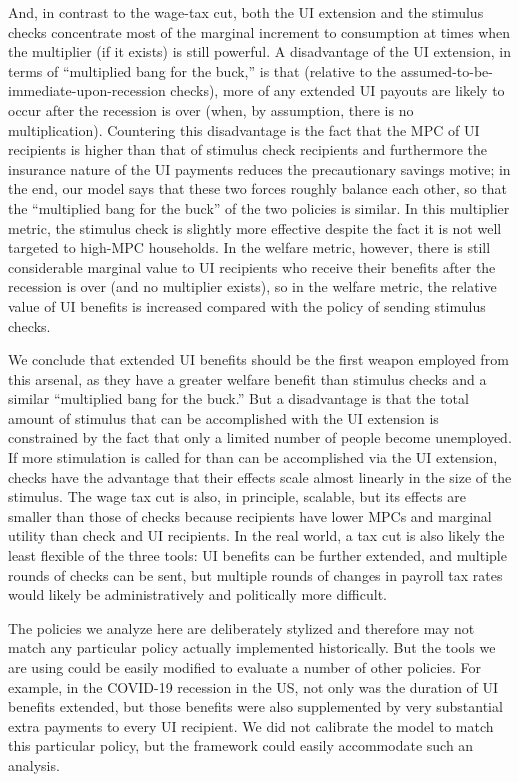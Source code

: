 \documentclass[\econtexRoot/HAFiscal]{subfiles}
\begin{document}
And, in contrast to the wage-tax cut, both the UI extension and the stimulus checks concentrate most of the marginal increment to consumption at times when the multiplier (if it exists) is still powerful.  A disadvantage of the UI extension, in terms of ``multiplied bang for the buck,'' is that (relative to the assumed-to-be-immediate-upon-recession checks), more of any extended UI payouts are likely to occur after the recession is over (when, by assumption, there is no multiplication).  Countering this disadvantage is the fact that the MPC of UI recipients is higher than that of stimulus check recipients and furthermore the insurance nature of the UI payments reduces the precautionary savings motive; in the end, our model says that these two forces roughly balance each other, so that the ``multiplied bang for the buck'' of the two policies is similar.  In this multiplier metric, the stimulus check is slightly more effective despite the fact it is not well targeted to high-MPC households.  In the welfare metric, however, there is still considerable marginal value to UI recipients who receive their benefits after the recession is over (and no multiplier exists), so in the welfare metric, the relative value of UI benefits is increased compared with the policy of sending stimulus checks.

We conclude that extended UI benefits should be the first weapon employed from this arsenal, as they have a greater welfare benefit than stimulus checks and a similar ``multiplied bang for the buck.'' But a disadvantage is that the total amount of stimulus that can be accomplished with the UI extension is constrained by the fact that only a limited number of people become unemployed.  If more stimulation is called for than can be accomplished via the UI extension, checks have the advantage that their effects scale almost linearly in the size of the stimulus.  The wage tax cut is also, in principle, scalable, but its effects are smaller than those of checks because recipients have lower MPCs and marginal utility than check and UI recipients.  In the real world, a tax cut is also likely the least flexible of the three tools:  UI benefits can be further extended, and multiple rounds of checks can be sent, but multiple rounds of changes in payroll tax rates would likely be administratively and politically more difficult.

The policies we analyze here are deliberately stylized and therefore may not match any particular policy actually implemented historically.  But the tools we are using could be easily modified to evaluate a number of other policies.  For example, in the COVID-19 recession in the US, not only was the duration of UI benefits extended, but those benefits were also supplemented by very substantial extra payments to every UI recipient.  We did not calibrate the model to match this particular policy, but the framework could easily accommodate such an analysis.
\end{document}

